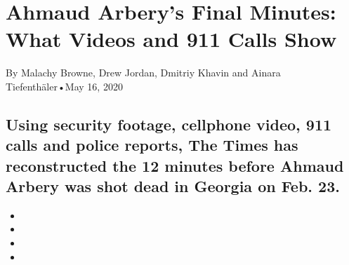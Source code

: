 \hypertarget{ahmaud-arberys-final-minutes-what-videos-and-911-calls-show-1}{%
\section{Ahmaud Arbery's Final Minutes: What Videos and 911 Calls
Show}\label{ahmaud-arberys-final-minutes-what-videos-and-911-calls-show-1}}

By Malachy Browne, Drew Jordan, Dmitriy Khavin and Ainara
Tiefenthäler•May 16, 2020

\hypertarget{using-security-footage-cellphone-video-911-calls-and-police-reports-the-times-has-reconstructed-the-12-minutes-before-ahmaud-arbery-was-shot-dead-in-georgia-on-feb-23-1}{%
\subsection{Using security footage, cellphone video, 911 calls and
police reports, The Times has reconstructed the 12 minutes before Ahmaud
Arbery was shot dead in Georgia on Feb.
23.}\label{using-security-footage-cellphone-video-911-calls-and-police-reports-the-times-has-reconstructed-the-12-minutes-before-ahmaud-arbery-was-shot-dead-in-georgia-on-feb-23-1}}

\begin{itemize}
\item
\item
\item
\item
\end{itemize}

